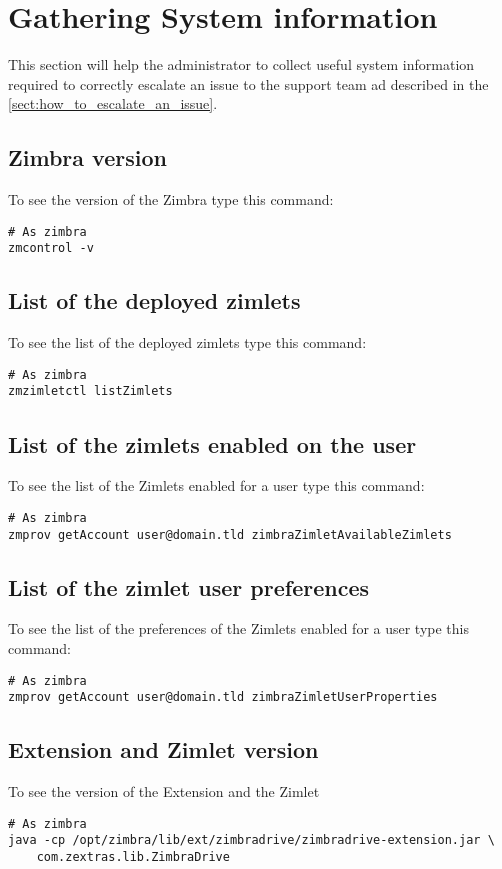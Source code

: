 \section{Gathering System information}
\label{sect:gatheringinfo}

This section will help the administrator to collect useful system information
required to correctly escalate an issue to the support team ad described in the
\autoref{sect:how_to_escalate_an_issue}.

    \subsection{Zimbra version}
    \label{sect:gatheringinfo-zversion}
        To see the version of the Zimbra type this command:
        \begin{verbatim}
# As zimbra
zmcontrol -v
        \end{verbatim}

    \subsection{List of the deployed zimlets}
    \label{sect:gatheringinfo-listzimlets}
        To see the list of the deployed zimlets type this command:
        \begin{verbatim}
# As zimbra
zmzimletctl listZimlets
        \end{verbatim}

    \subsection{List of the zimlets enabled on the user}
    \label{sect:gatheringinfo-userzimlets}
        To see the list of the Zimlets enabled for a user type this command:
        \begin{verbatim}
# As zimbra
zmprov getAccount user@domain.tld zimbraZimletAvailableZimlets
        \end{verbatim}

    \subsection{List of the zimlet user preferences}
    \label{sect:gatheringinfo-userzimlets-pref}
        To see the list of the preferences of the Zimlets enabled for a user type this command:
        \begin{verbatim}
# As zimbra
zmprov getAccount user@domain.tld zimbraZimletUserProperties
        \end{verbatim}

    \subsection{Extension and Zimlet version}
    \label{sect:gatheringinfo-extension}
        To see the version of the Extension and the Zimlet
        \begin{verbatim}
# As zimbra
java -cp /opt/zimbra/lib/ext/zimbradrive/zimbradrive-extension.jar \
    com.zextras.lib.ZimbraDrive
        \end{verbatim}
